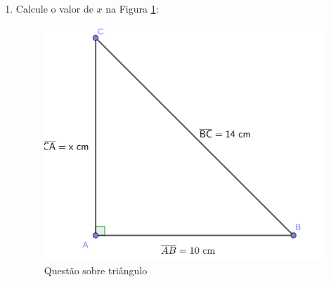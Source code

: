 \documentclass[a4paper, 12pt]{article}
\begin{document}
\begin{enumerate}
    \item Calcule o valor de $x$ na Figura \ref{meu-outro-teste-rotulo}: %
    
    \begin{figure}[htb] %
                        
    
    
        \centering %
        
        \includegraphics[scale=1]{exercicio.png} %
        
        \caption{Questão sobre triângulo} %
        
        \label{meu-outro-teste-rotulo} %
    \end{figure}
    

\end{enumerate}
\end{document}
